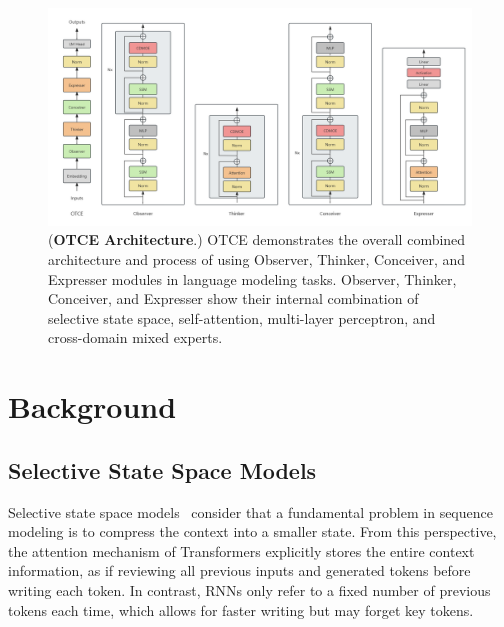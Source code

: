 \documentclass{article}
\theoremstyle{plain}
\theoremstyle{definition}
\theoremstyle{remark}
\begin{document}
\begin{figure}[H]
   \centering
   \includegraphics[width=1.0\linewidth]{fig/otce.png}
   \caption{(\textbf{OTCE Architecture}.) OTCE demonstrates the overall combined architecture and process of using Observer, Thinker, Conceiver, and Expresser modules in language modeling tasks. Observer, Thinker, Conceiver, and Expresser show their internal combination of selective state space, self-attention, multi-layer perceptron, and cross-domain mixed experts.}
   \label{fig:otce}
\end{figure}



\section{Background}
\subsection{Selective State Space Models}


Selective state space models~\cite{gu2023mamba} consider that a fundamental problem in sequence modeling is to compress the context into a smaller state. From this perspective, the attention mechanism of Transformers explicitly stores the entire context information, as if reviewing all previous inputs and generated tokens before writing each token. In contrast, RNNs only refer to a fixed number of previous tokens each time, which allows for faster writing but may forget key tokens.
\end{document}
